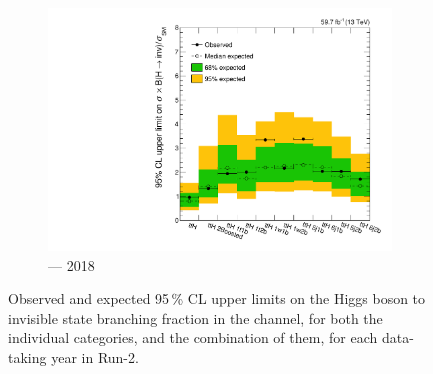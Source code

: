 \begin{figure}[htbp]
    \begin{subfigure}[b]{0.45\textwidth}
        \includegraphics[width=\textwidth]{chapters/higgstoinv/figures/limits/ttH/limit_2018_ttH.pdf}
        \caption{\ttH --- 2018}
    \end{subfigure}
    \caption[Observed and expected 95\,\% CL upper limits on the Higgs boson to invisible state branching fraction in the \ttH channel, for both the individual categories, and the combination of them, for each data-taking year in Run-2]{Observed and expected 95\,\% CL upper limits on the Higgs boson to invisible state branching fraction in the \ttH channel, for both the individual categories, and the combination of them, for each data-taking year in Run-2.}
    \label{fig:htoinv_limit_ttH_per_year}
\end{figure}


